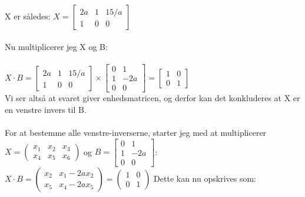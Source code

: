 \documentclass{article}
\begin{document}
\\
X er således: $X=\left[\begin{array}{ccc}2 a & 1 & 15 / a \\ 1 & 0 & 0\end{array}\right]$
\\
\\
Nu multiplicerer jeg X og B:
\\
\\
$X \cdot B=\left[\begin{array}{ccc}2 a & 1 & 15 / a \\ 1 & 0 & 0\end{array}\right] \times\left[\begin{array}{cc}0 & 1 \\ 1 & -2 a \\ 0 & 0\end{array}\right]=\left[\begin{array}{ll}1 & 0 \\ 0 & 1\end{array}\right]$
\\
Vi ser altså at svaret giver enhedsmatricen, og derfor kan det konkluderes at X er en venstre invers til B.
\\
\\
For at bestemme alle venstre-inverserne, starter jeg med at multiplicerer $X=\left(\begin{array}{lll}x_1 & x_2 & x_3 \\ x_4 & x_5 & x_6\end{array}\right)$ og $B=\left[\begin{array}{cc}0 & 1 \\ 1 & -2 a \\ 0 & 0\end{array}\right]$:
$X \cdot B=\left(\begin{array}{ll}x_2 & x_1-2 a x_2 \\ x_5 & x_4-2 a x_5\end{array}\right)=\left(\begin{array}{ll}1 & 0 \\ 0 & 1\end{array}\right)$
Dette kan nu opskrives som:
\\
\\
\\
\end{document}

